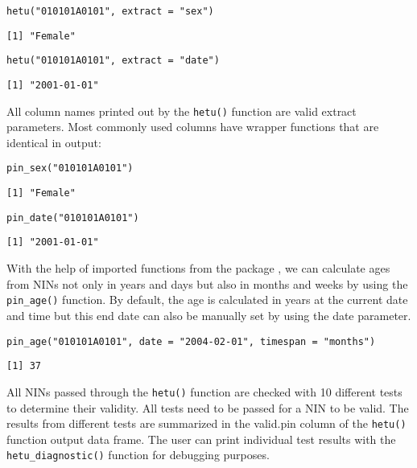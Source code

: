 \begin{verbatim}
hetu("010101A0101", extract = "sex")
\end{verbatim}

\begin{verbatim}
[1] "Female"
\end{verbatim}

\begin{verbatim}
hetu("010101A0101", extract = "date")
\end{verbatim}

\begin{verbatim}
[1] "2001-01-01"
\end{verbatim}

All column names printed out by the \texttt{hetu()} function are valid extract parameters. Most commonly used columns have wrapper functions that are identical in output:

\begin{verbatim}
pin_sex("010101A0101")
\end{verbatim}

\begin{verbatim}
[1] "Female"
\end{verbatim}

\begin{verbatim}
pin_date("010101A0101")
\end{verbatim}

\begin{verbatim}
[1] "2001-01-01"
\end{verbatim}

With the help of imported functions from the  package \citep{lubridate}, we can calculate ages from NINs not only in years and days but also in months and weeks by using the \texttt{pin\_age()} function. By default, the age is calculated in years at the current date and time but this end date can also be manually set by using the date parameter.

\begin{verbatim}
pin_age("010101A0101", date = "2004-02-01", timespan = "months")
\end{verbatim}

\begin{verbatim}
[1] 37
\end{verbatim}

All NINs passed through the \texttt{hetu()} function are checked with 10 different tests to determine their validity. All tests need to be passed for a NIN to be valid. The results from different tests are summarized in the valid.pin column of the \texttt{hetu()} function output data frame. The user can print individual test results with the \texttt{hetu\_diagnostic()} function for debugging purposes.


